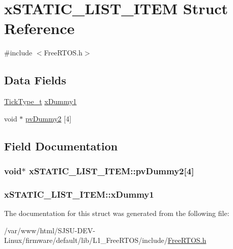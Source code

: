 \hypertarget{structxSTATIC__LIST__ITEM}{}\section{x\+S\+T\+A\+T\+I\+C\+\_\+\+L\+I\+S\+T\+\_\+\+I\+T\+EM Struct Reference}
\label{structxSTATIC__LIST__ITEM}


{\ttfamily \#include $<$Free\+R\+T\+O\+S.\+h$>$}

\subsection*{Data Fields}
\begin{DoxyCompactItemize}
\item 
\hyperlink{portmacro_8h_aa69c48c6e902ce54f70886e6573c92a9}{Tick\+Type\+\_\+t} \hyperlink{structxSTATIC__LIST__ITEM_abdb8e415f1bcfbba19fbf57d8d4e9438}{x\+Dummy1}
\item 
void $\ast$ \hyperlink{structxSTATIC__LIST__ITEM_a53c6cb2b8094f991254635d04c9be55b}{pv\+Dummy2} \mbox{[}4\mbox{]}
\end{DoxyCompactItemize}


\subsection{Field Documentation}
\subsubsection[{\texorpdfstring{pv\+Dummy2}{pvDummy2}}]{\setlength{\rightskip}{0pt plus 5cm}void$\ast$ x\+S\+T\+A\+T\+I\+C\+\_\+\+L\+I\+S\+T\+\_\+\+I\+T\+E\+M\+::pv\+Dummy2\mbox{[}4\mbox{]}}\hypertarget{structxSTATIC__LIST__ITEM_a53c6cb2b8094f991254635d04c9be55b}{}\label{structxSTATIC__LIST__ITEM_a53c6cb2b8094f991254635d04c9be55b}
\subsubsection[{\texorpdfstring{x\+Dummy1}{xDummy1}}]{ x\+S\+T\+A\+T\+I\+C\+\_\+\+L\+I\+S\+T\+\_\+\+I\+T\+E\+M\+::x\+Dummy1}\hypertarget{structxSTATIC__LIST__ITEM_abdb8e415f1bcfbba19fbf57d8d4e9438}{}\label{structxSTATIC__LIST__ITEM_abdb8e415f1bcfbba19fbf57d8d4e9438}


The documentation for this struct was generated from the following file\+:\begin{DoxyCompactItemize}
\item 
/var/www/html/\+S\+J\+S\+U-\/\+D\+E\+V-\/\+Linux/firmware/default/lib/\+L1\+\_\+\+Free\+R\+T\+O\+S/include/\hyperlink{FreeRTOS_8h}{Free\+R\+T\+O\+S.\+h}\end{DoxyCompactItemize}
